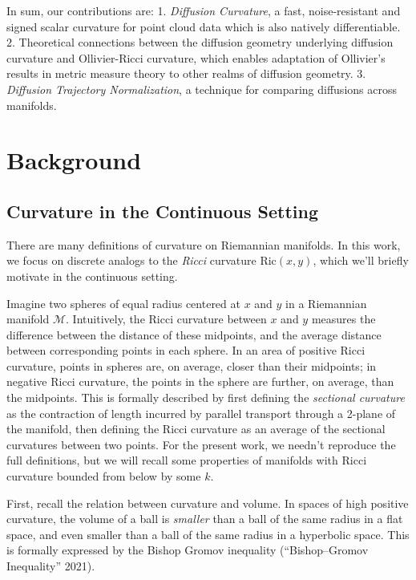\documentclass[
  letterpaper,
  DIV=11,
  numbers=noendperiod]{scrartcl}
\theoremstyle{plain}
\theoremstyle{plain}
\theoremstyle{definition}
\theoremstyle{plain}
\theoremstyle{definition}
\theoremstyle{plain}
\theoremstyle{remark}
\begin{document}
In sum, our contributions are: 1. \emph{Diffusion Curvature}, a fast,
noise-resistant and signed scalar curvature for point cloud data which
is also natively differentiable. 2. Theoretical connections between the
diffusion geometry underlying diffusion curvature and Ollivier-Ricci
curvature, which enables adaptation of Ollivier's results in metric
measure theory to other realms of diffusion geometry. 3. \emph{Diffusion
Trajectory Normalization}, a technique for comparing diffusions across
manifolds.

\section{Background}\label{background}

\subsection{Curvature in the Continuous
Setting}\label{curvature-in-the-continuous-setting}

There are many definitions of curvature on Riemannian manifolds. In this
work, we focus on discrete analogs to the \emph{Ricci} curvature
\(\text{Ric}(x,y)\), which we'll briefly motivate in the continuous
setting.

Imagine two spheres of equal radius centered at \(x\) and \(y\) in a
Riemannian manifold \(\mathcal{M}\). Intuitively, the Ricci curvature
between \(x\) and \(y\) measures the difference between the distance of
these midpoints, and the average distance between corresponding points
in each sphere. In an area of positive Ricci curvature, points in
spheres are, on average, closer than their midpoints; in negative Ricci
curvature, the points in the sphere are further, on average, than the
midpoints. This is formally described by first defining the
\emph{sectional curvature} as the contraction of length incurred by
parallel transport through a 2-plane of the manifold, then defining the
Ricci curvature as an average of the sectional curvatures between two
points. For the present work, we needn't reproduce the full definitions,
but we will recall some properties of manifolds with Ricci curvature
bounded from below by some \(k\).

First, recall the relation between curvature and volume. In spaces of
high positive curvature, the volume of a ball is \emph{smaller} than a
ball of the same radius in a flat space, and even smaller than a ball of
the same radius in a hyperbolic space. This is formally expressed by the
Bishop Gromov inequality ({``Bishop--{Gromov} Inequality''} 2021).
\end{document}
